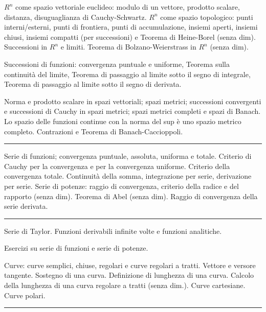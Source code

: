 \documentclass[a4paper,10pt]{article} %
\begin{document}
\small

\begin{multicols}{2}

$R^n$ come spazio vettoriale euclideo: modulo di un vettore, prodotto scalare, distanza, disuguaglianza di Cauchy-Schwartz. $R^n$ come spazio topologico: punti interni/esterni, punti di frontiera, punti di accumulazione, insiemi aperti, insiemi chiusi, insiemi compatti (per successioni) e Teorema di Heine-Borel (senza dim). Successioni in $R^n$ e limiti. Teorema di Bolzano-Weierstrass in $R^n$ (senza dim).

Successioni di funzioni: convergenza puntuale e uniforme, Teorema sulla continuità del limite, Teorema di passaggio al limite sotto il segno di integrale, Teorema di passaggio al limite sotto il segno di derivata. 

Norma e prodotto scalare in spazi vettoriali; spazi metrici; successioni convergenti e successioni di Cauchy in spazi metrici; spazi metrici completi e spazi di Banach. Lo spazio delle funzioni continue con la norma del sup è uno spazio metrico completo. Contrazioni e Teorema di Banach-Caccioppoli.


\bigbreak
\hrule
\bigbreak





Serie di funzioni; convergenza puntuale, assoluta, uniforma e totale. Criterio di Cauchy per la convergenza e per la convergenza uniforme. Criterio della convergenza totale. Continuità della somma, integrazione per serie, derivazione per serie.
Serie di potenze: raggio di convergenza, criterio della radice e del rapporto (senza dim). Teorema di Abel (senza dim). Raggio di convergenza della serie derivata.



\bigbreak
\hrule
\bigbreak



Serie di Taylor. Funzioni derivabili infinite volte e funzioni analitiche.

Esercizi su serie di funzioni e serie di potenze.

Curve: curve semplici, chiuse, regolari e curve regolari a tratti. Vettore e versore tangente. Sostegno di una curva. Definizione di lunghezza di una curva. Calcolo della lunghezza di una curva regolare a tratti (senza dim.). Curve cartesiane. Curve polari.



\bigbreak
\hrule
\bigbreak




\end{multicols}
\end{document}
